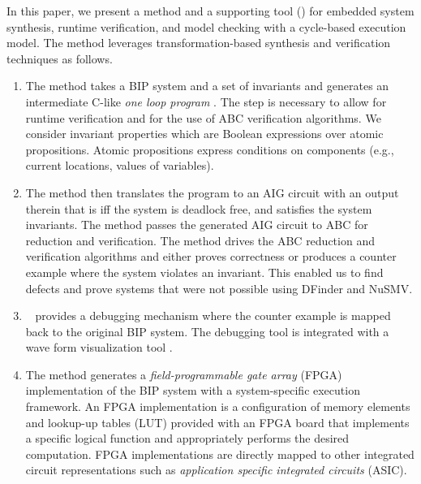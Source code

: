 In this paper, we present a method and a supporting tool (\biptool)
for embedded system synthesis, runtime verification,
and model checking with a cycle-based execution model.
The method leverages transformation-based synthesis and verification techniques 
as follows. 
%
\begin{enumerate}
\item The method takes a BIP system and a set of invariants and generates 
  an intermediate C-like {\em one loop program } \caig. 
  The \caig step is necessary to allow for runtime verification and for the use
  of ABC verification algorithms. We consider invariant properties which are Boolean expressions
over atomic propositions. Atomic propositions express conditions
on components (e.g., current locations, values of variables).

\item The method then translates the \caig program to 
  an AIG circuit with an output therein that is \true iff the system 
  is deadlock free, and satisfies the system invariants. 
  The method passes the generated AIG circuit to ABC for reduction and 
  verification. 
  The method drives the ABC reduction and verification algorithms and 
  either proves correctness or produces a counter example where the 
  system violates an invariant. 
  This enabled us to find defects and prove systems that were not 
  possible using DFinder and NuSMV. 

\item  \biptool~ provides a debugging mechanism where the 
  counter example is mapped back to the original BIP system. 
  The debugging tool is integrated with a wave form visualization tool 
  \cite{bybell2010gtkwave}.  
\item The method generates a {\em field-programmable gate array} (FPGA) 
  implementation of the BIP system with a 
  system-specific execution framework. 
  An FPGA implementation is a configuration of 
  memory elements and lookup-up tables (LUT) provided with an FPGA board
  that implements a specific logical function
  and appropriately performs the desired computation. 
  FPGA implementations are directly mapped to other integrated circuit representations
  such as {\em application specific integrated circuits} (ASIC). 


\end{enumerate}
